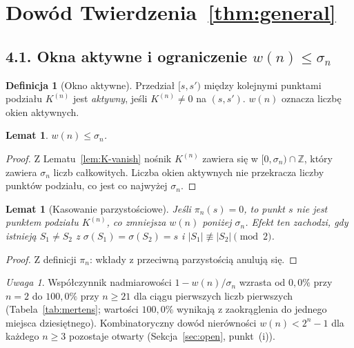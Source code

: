 \documentclass[11pt,a4paper]{amsart}
\theoremstyle{plain}
\newtheorem{lemma}[theorem]{Lemat}
\theoremstyle{definition}
\newtheorem{definition}[theorem]{Definicja}
\theoremstyle{remark}
\newtheorem{remark}[theorem]{Uwaga}
\begin{document}
\section{Dowód Twierdzenia~\ref{thm:general}}
\label{sec:proof-general}

\subsection*{4.1. Okna aktywne i ograniczenie $w(n) \leq \sigma_n$}

\begin{definition}[Okno aktywne]
\label{def:active}
Przedział $[s, s')$ między kolejnymi punktami podziału $K^{(n)}$
jest \emph{aktywny}, jeśli $K^{(n)} \neq 0$ na $(s, s')$.
$w(n)$ oznacza liczbę okien aktywnych.
\end{definition}

\begin{lemma}
\label{lem:w-bound}
$w(n) \leq \sigma_n$.
\end{lemma}

\begin{proof}
Z Lematu~\ref{lem:K-vanish} nośnik $K^{(n)}$ zawiera się
w $[0, \sigma_n) \cap \mathbb{Z}$, który zawiera $\sigma_n$
liczb całkowitych. Liczba okien aktywnych nie przekracza
liczby punktów podziału, co jest co najwyżej $\sigma_n$.
\end{proof}

\begin{lemma}[Kasowanie parzystościowe]
\label{lem:cancel}
Jeśli $\pi_n(s) = 0$, to punkt $s$ nie jest punktem podziału
$K^{(n)}$, co zmniejsza $w(n)$ poniżej $\sigma_n$.
Efekt ten zachodzi, gdy istnieją $S_1 \neq S_2$ z
$\sigma(S_1) = \sigma(S_2) = s$ i $|S_1| \not\equiv |S_2| \pmod{2}$.
\end{lemma}

\begin{proof}
Z definicji $\pi_n$: wkłady z przeciwną parzystością anulują się.
\end{proof}

\begin{remark}
\label{rem:cancellation-empirical}
Współczynnik nadmiarowości
$1 - w(n)/\sigma_n$ wzrasta od $0{,}0\%$ przy $n=2$
do $100{,}0\%$ przy $n \geq 21$ dla ciągu pierwszych liczb
pierwszych (Tabela~\ref{tab:mertens};
wartości $100{,}0\%$ wynikają z zaokrąglenia
do jednego miejsca dziesiętnego).
Kombinatoryczny dowód nierówności $w(n) < 2^n - 1$
dla każdego $n \geq 3$ pozostaje otwarty
(Sekcja~\ref{sec:open}, punkt~(i)).
\end{remark}
\end{document}
